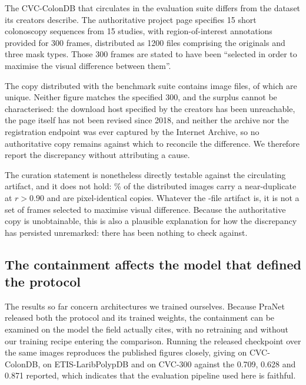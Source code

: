 \documentclass[11pt]{article}
\begin{document}
The CVC-ColonDB that circulates in the evaluation suite differs from the
dataset its creators describe. The authoritative project page specifies
15 short colonoscopy sequences from 15 studies, with region-of-interest
annotations provided for 300 frames, distributed as 1200 files comprising the
originals and three mask types. Those 300 frames are stated to have been
``selected in order to maximise the visual difference between them''.

The copy distributed with the benchmark suite contains \NColon{} image files,
of which \NUniqueColon{} are unique. Neither figure matches the specified 300,
and the surplus cannot be characterised: the download host specified by the
creators has been unreachable, the page itself has not been revised since
2018, and neither the archive nor the registration endpoint was ever captured
by the Internet Archive, so no authoritative copy remains against which to
reconcile the difference. We therefore report the discrepancy without
attributing a cause.

The curation statement is nonetheless directly testable against the
circulating artifact, and it does not hold: \NearDupNinetyColon\% of the
distributed images carry a near-duplicate at $r > 0.90$ and
\NDupesColon{} are pixel-identical copies. Whatever the \NColon{}-file
artifact is, it is not a set of frames selected to maximise visual
difference. Because the authoritative copy is unobtainable, this is also a
plausible explanation for how the discrepancy has persisted unremarked: there
has been nothing to check against.

\subsection*{The containment affects the model that defined the protocol}

The results so far concern architectures we trained ourselves. Because PraNet
released both the protocol and its trained weights, the containment can be
examined on the model the field actually cites, with no retraining and
without our training recipe entering the comparison. Running the released
checkpoint over the same images reproduces the published figures closely,
giving \PraNetColon{} on CVC-ColonDB, \PraNetEtis{} on ETIS-LaribPolypDB and
\PraNetCVCThree{} on CVC-300 against the \num{0.709}, \num{0.628} and
\num{0.871} reported, which indicates that the evaluation pipeline used here
is faithful.
\end{document}
